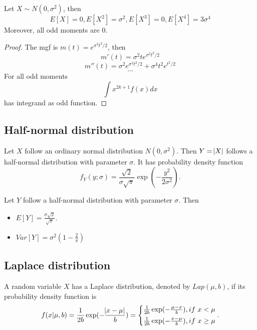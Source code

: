 \begin{refsection}
\begin{corollary}
Let $X\sim N(0,\sigma^2)$, then
$$E[X] = 0, E[X^2]=\sigma^2, E[X^3] = 0, E[X^4] = 3\sigma^4$$
Moreover, all odd moments are 0.
\end{corollary}
\begin{proof}
	The mgf is $m(t)=e^{\sigma^2t^2/2}$, then
	$$m'(t) = \sigma^2te^{\sigma^2t^2/2}$$
	$$m''(t) = \sigma^2e^{\sigma^2t^2/2} + \sigma^4t^2e^{t^2/2}$$
	$$\dots$$
	For all odd moments
	$$\int x^{2k+1}f(x)dx$$
	has integrand as odd function. 
\end{proof}

\subsection{Half-normal distribution}
\begin{definition} Let $X$ follow an ordinary normal distribution $N(0, \sigma^2)$. Then $Y=\abs{X}$ follows a half-normal distribution with parameter $\sigma$. It has probability density function
	$$f_Y(y;\sigma) = \frac{\sqrt{2}}{\sigma\sqrt{\pi}}\exp(-\frac{y^2}{2\sigma^2}).$$	
\end{definition}

\begin{lemma}
Let $Y$ follow a half-normal distribution with parameter $\sigma$. Then\begin{itemize}
	\item $E[Y] = \frac{\sigma\sqrt{2}}{\sqrt{\pi}}$.
	\item $Var[Y] = \sigma^2(1- \frac{2}{\pi})$
\end{itemize}
\end{lemma}

\subsection{Laplace distribution}
\begin{definition}
A random variable $X$ has a Laplace distribution, denoted by $Lap(\mu,b)$, if its probability density function is
$$f(x|\mu,b) = \frac{1}{2b}\exp(-\frac{\abs{x-\mu}}{b}) = \begin{cases*}
\frac{1}{2b}\exp(-\frac{\mu-x}{b}), if~x<\mu \\
\frac{1}{2b}\exp(-\frac{x-\mu}{b}), if~x\geq \mu \\
\end{cases*}.$$	
\end{definition}


\end{refsection}
